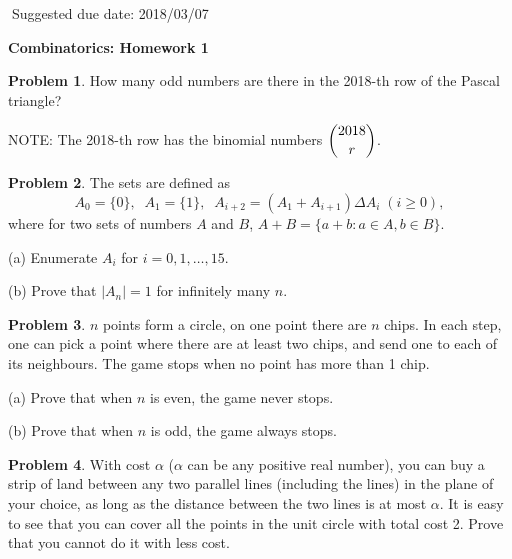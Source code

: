 \documentclass[12pt]{article}
\theoremstyle{definition}
\newtheorem{hw}{Problem}
\begin{document}
	
	$\;$\hfill Suggested due date: 2018/03/07
	
	\bigskip
	
	\begin{center}
		{\LARGE\bf Combinatorics: Homework 1}
	\end{center}
	
	\bigskip
	
	\begin{hw}
		
		How many odd numbers are there in the 2018-th row of the Pascal triangle?
		
		NOTE: The 2018-th row has the binomial numbers $\dbinom{2018}{r}$.
	\end{hw}
	
	\begin{hw}
		The sets are defined as
		\[
		A_0 = \{0\}, \;\; A_1 = \{1\}, \;\; A_{i+2}=(A_1 + A_{i+1})\Delta A_{i} \; (i \geq 0),
		\]
		where for two sets of numbers $A$ and $B$, $A+B = \{a+b : a \in A, b \in B\}$.
		
		(a) Enumerate $A_i$ for $i=0, 1, \dots, 15$.
		
		(b) Prove that $|A_n| = 1$ for infinitely many $n$.
	\end{hw}
	
	\begin{hw}
		$n$ points form a circle, on one point there are $n$ chips. In each step, one can pick a point where there are at least two chips, and send one to each of its neighbours.
		The game stops when no point has more than 1 chip.
		
		(a) Prove that when $n$ is even, the game never stops.
		
		(b) Prove that when $n$ is odd, the game always stops.
	\end{hw}
	
	\begin{hw}
		With cost $\alpha$ ($\alpha$ can be any positive real number), you can buy a strip of land between any two parallel lines (including the lines) in the plane of your choice, as long as the distance between the two lines is at most $\alpha$. It is easy to see that you can cover all the points in the unit circle with total cost 2. Prove that you cannot do it with less cost.
		
	\end{hw}
	
\end{document}
